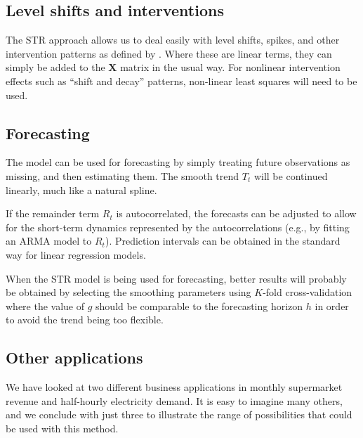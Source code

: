 \documentclass[ijds,nonblindrev]{informs-ijds}
\begin{document}
\hypertarget{level-shifts-and-interventions}{%
\subsection{Level shifts and interventions}\label{level-shifts-and-interventions}}

The STR approach allows us to deal easily with level shifts, spikes, and other intervention patterns as defined by \citet{BoxTiao1975}. Where these are linear terms, they can simply be added to the \(\bm{X}\) matrix in the usual way. For nonlinear intervention effects such as ``shift and decay'' patterns, non-linear least squares will need to be used.

\hypertarget{forecasting}{%
\subsection{Forecasting}\label{forecasting}}

The model can be used for forecasting by simply treating future observations as missing, and then estimating them. The smooth trend \(T_t\) will be continued linearly, much like a natural spline.

If the remainder term \(R_t\) is autocorrelated, the forecasts can be adjusted to allow for the short-term dynamics represented by the autocorrelations (e.g., by fitting an ARMA model to \(R_t\)). Prediction intervals can be obtained in the standard way for linear regression models.

When the STR model is being used for forecasting, better results will probably be obtained by selecting the smoothing parameters using \(K\)-fold cross-validation where the value of \(g\) should be comparable to the forecasting horizon \(h\) in order to avoid the trend being too flexible.

\hypertarget{other-applications}{%
\subsection{Other applications}\label{other-applications}}

We have looked at two different business applications in monthly supermarket revenue and half-hourly electricity demand. It is easy to imagine many others, and we conclude with just three to illustrate the range of possibilities that could be used with this method.
\end{document}
